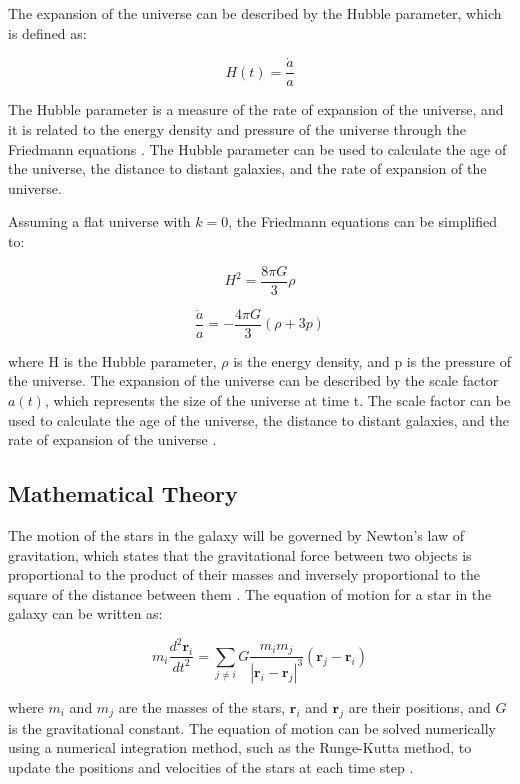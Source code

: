 \documentclass[10pt]{article}
\begin{document}
The expansion of the universe can be described by the Hubble parameter, which is defined as:

\begin{equation}
H(t) = \frac{\dot{a}}{a}
\end{equation}

The Hubble parameter is a measure of the rate of expansion of the universe, and it is related to the energy density and pressure of the universe through the Friedmann equations \cite{hubble1929}. The Hubble parameter can be used to calculate the age of the universe, the distance to distant galaxies, and the rate of expansion of the universe.

Assuming a flat universe with $k = 0$, the Friedmann equations can be simplified to:

\begin{equation}
H^2 = \frac{8\pi G}{3} \rho
\end{equation}

\begin{equation}
\frac{\ddot{a}}{a} = -\frac{4\pi G}{3} (\rho + 3p)
\end{equation}

where H is the Hubble parameter, $\rho$ is the energy density, and p is the pressure of the universe. The expansion of the universe can be described by the scale factor $a(t)$, which represents the size of the universe at time t. The scale factor can be used to calculate the age of the universe, the distance to distant galaxies, and the rate of expansion of the universe \cite{peebles1993principles}.

\subsection*{Mathematical Theory}

The motion of the stars in the galaxy will be governed by Newton's law of gravitation, which states that the gravitational force between two objects is proportional to the product of their masses and inversely proportional to the square of the distance between them \cite{newton1687principia}. The equation of motion for a star in the galaxy can be written as:

\begin{equation}
m_i \frac{d^2\mathbf{r}_i}{dt^2} = \sum_{j \neq i} G \frac{m_i m_j}{|\mathbf{r}_i - \mathbf{r}_j|^3} (\mathbf{r}_j - \mathbf{r}_i)
\end{equation}

where $m_i$ and $m_j$ are the masses of the stars, $\mathbf{r}_i$ and $\mathbf{r}_j$ are their positions, and $G$ is the gravitational constant. The equation of motion can be solved numerically using a numerical integration method, such as the Runge-Kutta method, to update the positions and velocities of the stars at each time step \cite{press1992numerical}.
\end{document}
